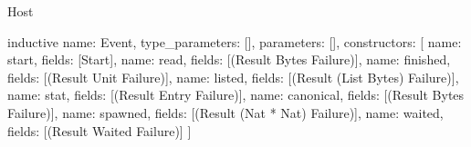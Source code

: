 \begin{lexlean}{Host}
\begin{semanticmodule}
inductive{
  name: Event,
  type_parameters: [],
  parameters: [],
  constructors: [
    {name: start, fields: [Start]},
    {name: read, fields: [(Result Bytes Failure)]},
    {name: finished, fields: [(Result Unit Failure)]},
    {name: listed, fields: [(Result (List Bytes) Failure)]},
    {name: stat, fields: [(Result Entry Failure)]},
    {name: canonical, fields: [(Result Bytes Failure)]},
    {name: spawned, fields: [(Result (Nat * Nat) Failure)]},
    {name: waited, fields: [(Result Waited Failure)]}
  ]
}
\end{semanticmodule}
\end{lexlean}
